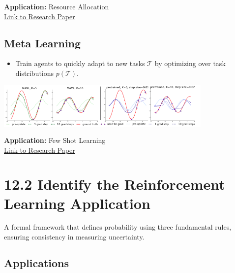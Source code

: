 \documentclass[
  letterpaper,
  DIV=11,
  numbers=noendperiod]{scrreprt}
\providecommand{\tightlist}{%
  \setlength{\itemsep}{0pt}\setlength{\parskip}{0pt}}\usepackage{longtable,booktabs,array}
\begin{document}
\textbf{Application:} Resource Allocation\\
\href{https://dl.acm.org/doi/10.1145/1390156.1390162}{Link to Research
Paper}

\section{Meta Learning}\label{meta-learning}

\begin{itemize}
\tightlist
\item
  Train agents to quickly adapt to new tasks \(\mathcal{T}\) by
  optimizing over task distributions \(p(\mathcal{T})\).
\end{itemize}

\includegraphics[width=4.16667in,height=\textheight,keepaspectratio]{lecture12/images/MetaLearning.png}

\textbf{Application:} Few Shot Learning\\
\href{https://arxiv.org/pdf/1703.03400}{Link to Research Paper}

\chapter{12.2 Identify the Reinforcement Learning
Application}\label{identify-the-reinforcement-learning-application}

\begin{tcolorbox}[enhanced jigsaw, colback=white, left=2mm, breakable, opacityback=0, bottomrule=.15mm, rightrule=.15mm, arc=.35mm, colframe=quarto-callout-note-color-frame, leftrule=.75mm, toprule=.15mm]

A formal framework that defines probability using three fundamental
rules, ensuring consistency in measuring uncertainty. 🎲

\end{tcolorbox}

\section{Applications}\label{applications}
\end{document}
